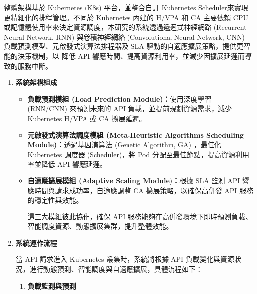 \documentclass[12pt,a4paper]{article}
\begin{document}
\begin{enumerate}[label={(\zhdig*)}, leftmargin=2\parindent, listparindent=\parindent]
\begin{enumerate}[label={(\arabic*)}, leftmargin=\parindent, listparindent=\parindent]
整體架構基於 Kubernetes (K8s) 平台，並整合自訂 Kubernetes Scheduler\cite{19}來實現更精細化的排程管理。不同於 Kubernetes 內建的 H/VPA 和 CA 主要依賴 CPU 或記憶體使用率來決定資源調度\cite{18}，本研究的系統透過遞迴式神經網路 (Recurrent Neural Network, RNN) 與卷積神經網絡 (Convolutional Neural Network, CNN) 負載預測模型、元啟發式演算法排程器及 SLA 驅動的自適應擴展策略，提供更智能的決策機制，以 降低 API 響應時間、提高資源利用率，並減少因擴展延遲而導致的服務中斷。
\begin{enumerate}[label={(\zhdig*)}, leftmargin=\parindent, listparindent=\parindent]
\item \textbf{
系統架構組成}

\begin{itemize}[leftmargin=\parindent, listparindent=\parindent]
    本系統架構主要包含三大核心模組，各自負責不同層級的優化：

    \item \textbf{負載預測模組 (Load Prediction Module)：}使用深度學習 (RNN/CNN) 來預測未來的 API 負載，並提前規劃資源需求，減少 Kubernetes H/VPA 或 CA 擴展延遲。

    \item \textbf{元啟發式演算法調度模組 (Meta-Heuristic Algorithms Scheduling Module)：}透過基因演算法 (Genetic Algorithm, GA) ，最佳化 Kubernetes 調度器 (Scheduler)，將 Pod 分配至最佳節點，提高資源利用率並降低 API 響應延遲。

    \item \textbf{自適應擴展模組 (Adaptive Scaling Module)：}根據 SLA 監測 API 響應時間與請求成功率，自適應調整 CA 擴展策略，以確保高併發 API 服務的穩定性與效能。

    這三大模組彼此協作，確保 API 服務能夠在高併發環境下即時預測負載、智能調度資源、動態擴展集群，提升整體效能。

\end{itemize}

    \item \textbf{
系統運作流程}

當 API 請求進入 Kubernetes 叢集時，系統將根據 API 負載變化與資源狀況，進行動態預測、智能調度與自適應擴展，具體流程如下：
\begin{enumerate}[label={(\arabic*)}, leftmargin=\parindent, listparindent=\parindent]

    \item\textbf{
負載監測與預測}
\begin{itemize}[leftmargin=\parindent, listparindent=\parindent]


\end{itemize}
\end{enumerate}
\end{enumerate}
\end{enumerate}
\end{enumerate}
\end{document}
